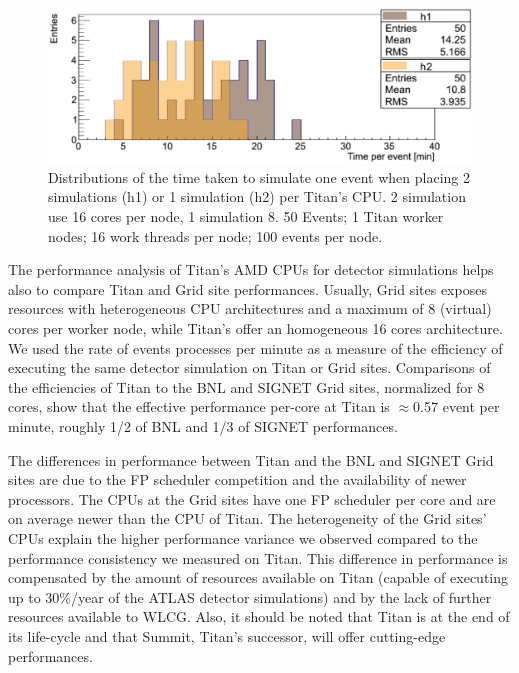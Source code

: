 \begin{figure}[htp]
    \includegraphics[clip,width=\columnwidth]{figures/tx8_tx16_comparison_vsquashed.pdf}
   \vspace{-0.3in}
    \caption{Distributions of the time taken to simulate one event when
    placing 2 simulations (h1) or 1 simulation (h2) per Titan's CPU\@. 2
    simulation use 16 cores per node, 1 simulation 8. 50 Events; 1 Titan
    worker nodes; 16 work threads per node; 100 events per node.}

\label{fig:comparison-8-16cores}
\end{figure}

The performance analysis of Titan's AMD CPUs for detector simulations helps
also to compare Titan and Grid site performances. Usually, Grid sites exposes
resources with heterogeneous CPU architectures and a maximum of 8 (virtual)
cores per worker node, while Titan's offer an homogeneous 16 cores
architecture. We used the rate of events processes per minute as a measure of
the efficiency of executing the same detector simulation on Titan or Grid
sites. Comparisons of the efficiencies of Titan to the BNL and SIGNET Grid
sites, normalized for 8 cores, show that the effective performance per-core
at Titan is $\approx$0.57 event per minute, roughly 1/2 of BNL and  1/3 of
SIGNET performances.

The differences in performance between Titan and the BNL and SIGNET Grid
sites are due to the FP scheduler competition and the availability of newer
processors. The CPUs at the Grid sites have one FP scheduler per core and are
on average newer than the CPU of Titan. The heterogeneity of the Grid sites'
CPUs explain the higher performance variance we observed compared to the
performance consistency we measured on Titan. This difference in performance
is compensated by the amount of resources available on Titan (capable of
executing up to 30\%/year of the ATLAS detector simulations) and by the lack
of further resources available to WLCG\@. Also, it should be noted that Titan
is at the end of its life-cycle and that Summit, Titan's successor, will
offer cutting-edge performances.

